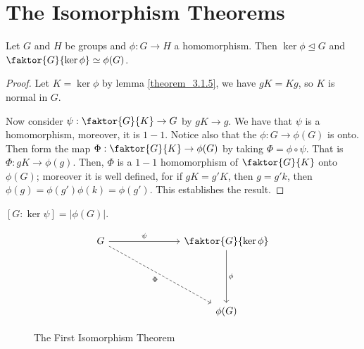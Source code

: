 \section{The Isomorphism Theorems}
\label{section_3.4}

\begin{theorem}\label{theorem_3.4.1}
  Let $G$ and  $H$ be groups and  $\phi:G \rightarrow H$ a homomorphism. Then
  $\ker{\phi} \unlhd G$ and $\faktor{G}{\ker{\phi}} \simeq \phi(G)$.
\end{theorem}
\begin{proof}
  Let $K=\ker{\phi}$ by lemma \ref{theorem_3.1.5}, we have $gK=Kg$, so  $K$ is
  normal in  $G$.

  Now consider $\psi:\faktor{G}{K} \rightarrow G$ by $gK \rightarrow g$. We
  have that $\psi$ is a homomorphism, moreover, it is $1-1$. Notice also that
  the $\phi:G \rightarrow \phi(G)$ is onto. Then form the map
  $\Phi:\faktor{G}{K} \rightarrow \phi(G)$ by taking $\Phi = \phi \circ \psi$.
  That is  $\Phi:gK \rightarrow \phi(g)$. Then, $\Phi$ is a $1-1$ homomorphism
  of  $\faktor{G}{K}$ onto $\phi(G)$; moreover it is well defined, for if
  $gK=g'K$, then  $g=g'k$, then  $\phi(g)=\phi(g')\phi(k)=\phi(g')$. This
  establishes the result.
\end{proof}
\begin{corollary}
  $[G : \ker{\psi}] = |\phi(G)|$.
\end{corollary}
\begin{figure}[h]
  \[\begin{tikzcd}
    G &&& {\faktor{G}{\ker{\phi}}} \\
    \\
    \\
      &&& {\phi(G)}
      \arrow["\psi", from=1-1, to=1-4]
      \arrow["\phi", from=1-4, to=4-4]
      \arrow["\Phi"', dashed, from=1-1, to=4-4]
  \end{tikzcd}\]
  \caption{The First Isomorphism Theorem}
  \label{fig_3.2}
\end{figure}

